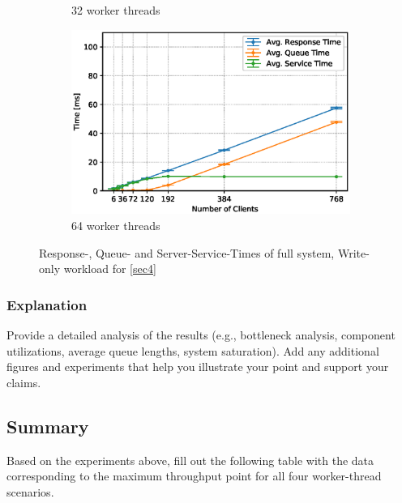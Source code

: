 \documentclass[11pt,a4paper]{article}
\begin{document}
\begin{figure}
\begin{subfigure}{.5\textwidth}
        \caption{32 worker threads}
    \end{subfigure}
    \begin{subfigure}{.5\textwidth}
        \includegraphics[width=1\linewidth]{plots/4b_extendedLatencyMiddleware_64w.eps}
        \caption{64 worker threads}
    \end{subfigure}

    \caption{Response-, Queue- and Server-Service-Times of full system, Write-only workload for \autoref{sec4}}
    \label{fig:4-times}
\end{figure}
\subsubsection{Explanation}

Provide a detailed analysis of the results (e.g., bottleneck analysis, component utilizations, average queue lengths, system saturation). Add any additional figures and experiments that help you illustrate your point and support your claims.

\subsection{Summary}

Based on the experiments above, fill out the following table with the data corresponding to the maximum throughput point for all four worker-thread scenarios.
\end{document}
